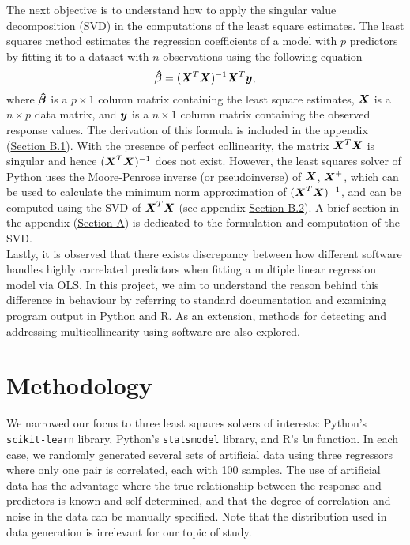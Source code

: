 \documentclass[12pt]{article}
\newcommand{\gbh}{\hat{\gb}}
\begin{document}
	The next objective is to understand how to apply the singular value decomposition (SVD) in the computations of the least square estimates. The least squares method estimates the regression coefficients of a model with $p$ predictors by fitting it to a dataset with $n$ observations using the following equation
	\begin{equation}
		\boldsymbol{\gbh}=(\bmX^T\bmX)^{-1}\bmX^T\bmy,\label{eq3}
	\end{equation}
	where $\boldsymbol{\gbh}$ is a $p\times 1$ column matrix containing the least square estimates, $\boldsymbol{X}$ is a $n\times p$ data matrix, and $\boldsymbol{y}$ is a $n\times 1$ column matrix containing the observed response values. The derivation of this formula is included in the appendix (\hyperref[sec:append1]{Section B.1}). With the presence of perfect collinearity, the matrix $\boldsymbol{X}^T\boldsymbol{X}$ is singular and hence $(\boldsymbol{X}^T\boldsymbol{X})^{-1}$ does not exist. However, the least squares solver of Python uses the Moore-Penrose inverse (or pseudoinverse) of $\boldsymbol{X}$, $\boldsymbol{X}^+$, which can be used to calculate the minimum norm approximation of $(\boldsymbol{X}^T\boldsymbol{X})^{-1}$, and can be computed using the SVD of $\boldsymbol{X}^T\boldsymbol{X}$ (see appendix \hyperref[sec:append2]{Section B.2}). A brief section in the appendix (\hyperref[sec:svd]{Section A}) is dedicated to the formulation and computation of the SVD.\\
	
	Lastly, it is observed that there exists discrepancy between how different software handles highly correlated predictors when fitting a multiple linear regression model via OLS. In this project, we aim to understand the reason behind this difference in behaviour by referring to standard documentation and examining program output in Python and R. As an extension, methods for detecting and addressing multicollinearity using software are also explored.
	
	\section{Methodology}
	
	We narrowed our focus to three least squares solvers of interests: Python's \texttt{scikit-learn} library, Python's \texttt{statsmodel} library, and R's \texttt{lm} function. In each case, we randomly generated several sets of artificial data using three regressors where only one pair is correlated, each with 100 samples. The use of artificial data has the advantage where the true relationship between the response and predictors is known and self-determined, and that the degree of correlation and noise in the data can be manually specified. Note that the distribution used in data generation is irrelevant for our topic of study.\\
	
\end{document}
